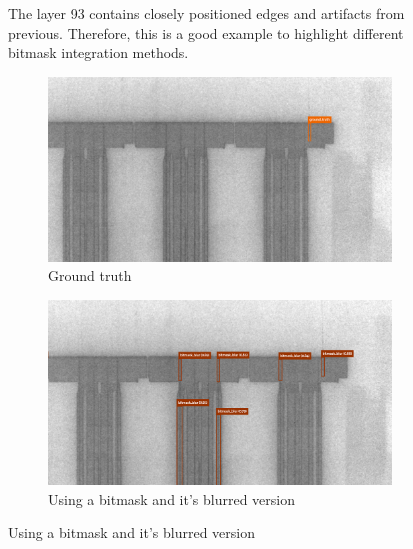 \begin{figure}[!h]
  \caption{The layer 93 contains closely positioned edges and artifacts from previous. Therefore, this is a good example to highlight different bitmask integration methods. }
  \label{app:layer_example}
\end{figure}

\begin{figure}[!h]
\centering
\begin{subfigure}{.9\textwidth}
  \centering
  \includegraphics[width=\linewidth]{images/implementation/results/bm/gt}
  \caption{Ground truth}
\end{subfigure}

\begin{subfigure}{.9\textwidth}
  \centering
  \includegraphics[width=\linewidth]{images/implementation/results/bm/bm_blur}
  \caption{Using a bitmask and it's blurred version}
\end{subfigure}


\end{figure}

